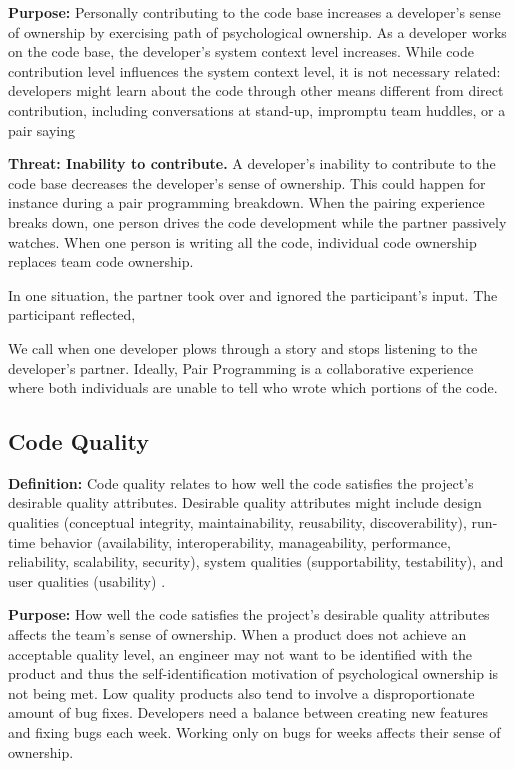 \textbf{Purpose:} Personally contributing to the code base increases a developer's sense of ownership by exercising  path of psychological ownership. As a developer works on the code base, the developer's system context level increases. While code contribution level influences the system context level, it is not necessary related: developers might learn about the code through other means different from direct contribution, including conversations at stand-up, impromptu team huddles, or a pair saying 

\textbf{Threat: Inability to contribute.}  A developer's inability to contribute to the code base decreases the developer's sense of ownership. This could happen for instance during a pair programming breakdown. When the pairing experience breaks down, one person drives the code development while the partner passively watches. When one person is writing all the code, individual code ownership replaces team code ownership.  

In one situation, the partner took over and ignored the participant's input. The participant reflected,  

We call  when one developer plows through a story and stops listening to the developer's partner. Ideally, Pair Programming is a collaborative experience where both individuals are unable to tell who wrote which portions of the code. 

\subsection{Code Quality}
\textbf{Definition:} Code quality relates to how well the code satisfies the project's desirable quality attributes. Desirable quality attributes might include design qualities (conceptual integrity, maintainability, reusability, discoverability), run-time behavior (availability, interoperability, manageability, performance, reliability, scalability, security), system qualities (supportability, testability), and user qualities (usability) \cite{Meier2009}. 

\textbf{Purpose:} How well the code satisfies the project's desirable quality attributes affects the team's sense of ownership. When a product does not achieve an acceptable quality level, an engineer may not want to be identified with the product and thus the self-identification motivation of psychological ownership is not being met. Low quality products also tend to involve a disproportionate amount of bug fixes. Developers need a balance between creating new features and fixing bugs each week. Working only on bugs for weeks affects their sense of ownership.    


